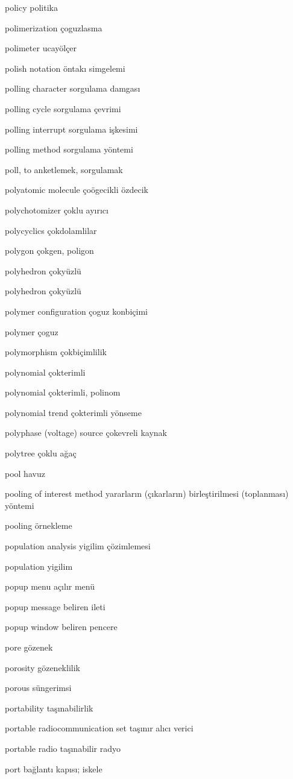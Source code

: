 \documentclass[12pt,fleqn]{article}\usepackage{../../common}
\begin{document}
policy politika

polimerization çoguzlasma

polimeter ucayölçer

polish notation öntakı simgelemi

polling character sorgulama damgası

polling cycle sorgulama çevrimi

polling interrupt sorgulama işkesimi

polling method sorgulama yöntemi

poll, to anketlemek, sorgulamak

polyatomic molecule çoögecikli özdecik

polychotomizer çoklu ayırıcı

polycyclics çokdolamlilar

polygon çokgen, poligon

polyhedron çokyüzlü

polyhedron çokyüzlü

polymer configuration çoguz konbiçimi

polymer çoguz

polymorphism çokbiçimlilik

polynomial çokterimli

polynomial çokterimli, polinom

polynomial trend çokterimli yönseme

polyphase (voltage) source çokevreli kaynak

polytree çoklu ağaç

pool havuz

pooling of interest method yararların (çıkarların) birleştirilmesi (toplanması) yöntemi

pooling örnekleme

population analysis yigilim çözimlemesi

population yigilim

popup menu açılır menü

popup message beliren ileti

popup window beliren pencere

pore gözenek

porosity gözeneklilik

porous süngerimsi

portability taşınabilirlik

portable radiocommunication set taşınır alıcı verici

portable radio taşınabilir radyo

port bağlantı kapısı; iskele
\end{document}
